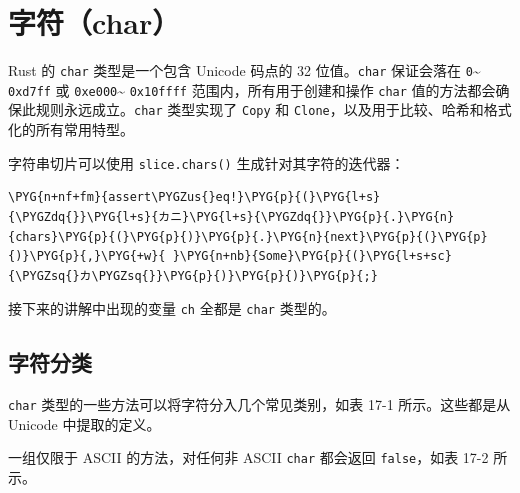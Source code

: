 \section{字符（char）}

Rust 的 \texttt{char} 类型是一个包含 Unicode 码点的 32 位值。\texttt{char} 保证会落在 \texttt{0}\textasciitilde{} \texttt{0xd7ff} 或 \texttt{0xe000}\textasciitilde{} \texttt{0x10ffff} 范围内，所有用于创建和操作 \texttt{char} 值的方法都会确保此规则永远成立。\texttt{char} 类型实现了 \texttt{Copy} 和 \texttt{Clone}，以及用于比较、哈希和格式化的所有常用特型。

字符串切片可以使用 \texttt{slice.chars()} 生成针对其字符的迭代器：

\begin{Verbatim}[commandchars=\\\{\},breaklines=true,breakanywhere=true,fontsize=\codefont,xleftmargin=17bp]
\PYG{n+nf+fm}{assert\PYGZus{}eq!}\PYG{p}{(}\PYG{l+s}{\PYGZdq{}}\PYG{l+s}{カニ}\PYG{l+s}{\PYGZdq{}}\PYG{p}{.}\PYG{n}{chars}\PYG{p}{(}\PYG{p}{)}\PYG{p}{.}\PYG{n}{next}\PYG{p}{(}\PYG{p}{)}\PYG{p}{,}\PYG{+w}{ }\PYG{n+nb}{Some}\PYG{p}{(}\PYG{l+s+sc}{\PYGZsq{}カ\PYGZsq{}}\PYG{p}{)}\PYG{p}{)}\PYG{p}{;}
\end{Verbatim}

接下来的讲解中出现的变量 \texttt{ch} 全都是 \texttt{char} 类型的。

\subsection{字符分类}

\texttt{char} 类型的一些方法可以将字符分入几个常见类别，如表 17-1 所示。这些都是从 Unicode 中提取的定义。



一组仅限于 ASCII 的方法，对任何非 ASCII \texttt{char} 都会返回 \texttt{false}，如表 17-2 所示。


